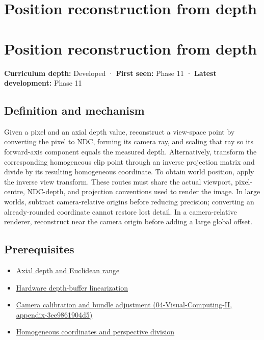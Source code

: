 \hypertarget{appendix-2cbf2968e866}{}
\section*{Position reconstruction from depth}
\section{Position reconstruction from depth}\label{position-reconstruction-from-depth}

\textbf{Curriculum depth:} Developed · \textbf{First seen:} Phase 11 · \textbf{Latest development:} Phase 11

\subsection{Definition and mechanism}\label{definition-and-mechanism}

Given a pixel and an axial depth value, reconstruct a view-space point by converting the pixel to NDC, forming its camera ray, and scaling that ray so its forward-axis component equals the measured depth. Alternatively, transform the corresponding homogeneous clip point through an inverse projection matrix and divide by its resulting homogeneous coordinate. To obtain world position, apply the inverse view transform. These routes must share the actual viewport, pixel-centre, NDC-depth, and projection conventions used to render the image. In large worlds, subtract camera-relative origins before reducing precision; converting an already-rounded coordinate cannot restore lost detail. In a camera-relative renderer, reconstruct near the camera origin before adding a large global offset.

\subsection{Prerequisites}\label{prerequisites}

\begin{itemize}
\tightlist
\item
  \hyperref[appendix-cac01ebeeb11]{Axial depth and Euclidean range}
\item
  \hyperref[appendix-1bc40b08db4a]{Hardware depth-buffer linearization}
\item
  \href{}{Camera calibration and bundle adjustment (04-Visual-Computing-II, appendix-3ee9861904d5)}
\item
  \hyperref[appendix-cb3b26862282]{Homogeneous coordinates and perspective division}
\end{itemize}

